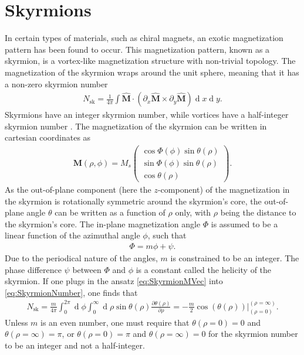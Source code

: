 \documentclass[12pt, a4paper, twoside, openright]{report}
\renewcommand{\d}[1]{\ensuremath{\operatorname{d}\!{#1}}}
\numberwithin{equation}{chapter}
\numberwithin{figure}{chapter}
\numberwithin{table}{chapter}
\begin{document}
\section{Skyrmions}
In certain types of materials, such as chiral magnets, an exotic magnetization pattern has been found to occur. This magnetization pattern, known as a skyrmion, is a vortex-like magnetization structure with non-trivial topology. The magnetization of the skyrmion wraps around the unit sphere, meaning that it has a non-zero skyrmion number \cite{Heinze2011}
\begin{align}
\label{eq:SkyrmionNumber}
N_{\textrm{sk}} = \frac{1}{4\pi}\int \mathbold{\hat{M}}\cdot(\partial_x \mathbold{\hat{M}} \times \partial_y \mathbold{\hat{M}}) \d x \d y.
\end{align}
Skyrmions have an integer skyrmion number, while vortices have a half-integer skyrmion number \cite{Tretiakov2007}. The magnetization of the skyrmion can be written in cartesian coordinates as
\begin{align}
\label{eq:SkyrmionMVec}
\mathbold{M}(\rho, \phi) = M_s
\begin{pmatrix}
\cos\Phi(\phi)\sin\theta(\rho) \\ \sin\Phi(\phi)\sin\theta(\rho) \\ \cos\theta(\rho)
\end{pmatrix}.
\end{align}
As the out-of-plane component (here the $z$-component) of the magnetization in the skyrmion is rotationally symmetric around the skyrmion's core, the out-of-plane angle $\theta$ can be written as a function of $\rho$ only, with $\rho$ being the distance to the skyrmion's core. The in-plane magnetization angle $\Phi$ is assumed to be a linear function of the azimuthal angle $\phi$, such that
\begin{align}
\Phi = m\phi + \psi.
\end{align}
Due to the periodical nature of the angles, $m$ is constrained to be an integer. The phase difference $\psi$ between $\Phi$ and $\phi$ is a constant called the helicity of the skyrmion. If one plugs in the ansatz \eqref{eq:SkyrmionMVec} into \eqref{eq:SkyrmionNumber}, one finds that
\begin{align}
N_{\textrm{sk}} = \frac{m}{4\pi}\int_0^{2\pi}\d\phi \int_0^{\infty}\d \rho \sin\theta(\rho) \frac{\partial\theta(\rho)}{\partial\rho} = - \frac{m}{2} \cos(\theta(\rho))|_{(\rho = 0)}^{(\rho=\infty)}.
\end{align}
Unless $m$ is an even number, one must require that $\theta(\rho = 0) = 0$ and $\theta(\rho = \infty) = \pi$, or $\theta(\rho = 0) = \pi$ and $\theta(\rho = \infty) = 0$ for the skyrmion number to be an integer and not a half-integer.
\end{document}
